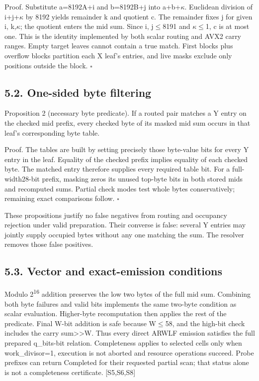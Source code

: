\documentclass[10pt,letterpaper]{article}
\begin{document}
Proof. Substitute a=8192A+i and b=8192B+j into a+b+\ensuremath{\kappa}. Euclidean division of i+j+\ensuremath{\kappa} by 8192 yields remainder k and quotient c. The remainder fixes j for given i, k,\ensuremath{\kappa}; the quotient enters the mid sum. Since i, j\ensuremath{\leq}8191 and \ensuremath{\kappa}\ensuremath{\leq}1, c is at most one. This is the identity implemented by both scalar routing and AVX2 carry ranges. Empty target leaves cannot contain a true match. First blocks plus overflow blocks partition each X leaf's entries, and live masks exclude only positions outside the block. \ensuremath{\square}


\subsection*{5.2. One-sided byte filtering}

Proposition 2 (necessary byte predicate). If a routed pair matches a Y entry on the checked mid prefix, every checked byte of its masked mid sum occurs in that leaf's corresponding byte table.


Proof. The tables are built by setting precisely those byte-value bits for every Y entry in the leaf. Equality of the checked prefix implies equality of each checked byte. The matched entry therefore supplies every required table bit. For a full-width28-bit prefix, masking zeros its unused top-byte bits in both stored mids and recomputed sums. Partial check modes test whole bytes conservatively; remaining exact comparisons follow. \ensuremath{\square}


These propositions justify no false negatives from routing and occupancy rejection under valid preparation. Their converse is false: several Y entries may jointly supply occupied bytes without any one matching the sum. The resolver removes those false positives.


\subsection*{5.3. Vector and exact-emission conditions}

Modulo 2\textsuperscript{1}\textsuperscript{6} addition preserves the low two bytes of the full mid sum. Combining both byte failures and valid bits implements the same two-byte condition as scalar evaluation. Higher-byte recomputation then applies the rest of the predicate. Final W-bit addition is safe because W\ensuremath{\leq}58, and the high-bit check includes the carry sum>>W. Thus every direct ARWLF emission satisfies the full prepared q\_bits-bit relation. Completeness applies to selected cells only when work\_divisor=1, execution is not aborted and resource operations succeed. Probe prefixes can return Completed for their requested partial scan; that status alone is not a completeness certificate. [S5,S6,S8]
\end{document}
